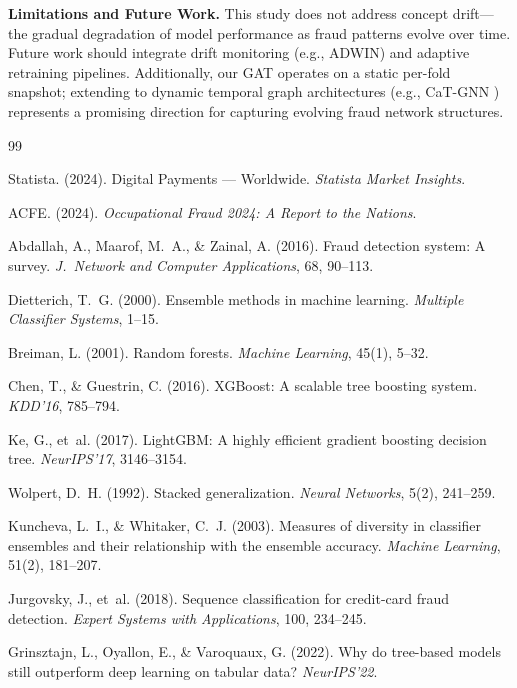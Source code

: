 \documentclass[10pt,a4paper,twocolumn]{article}
\begin{document}
\textbf{Limitations and Future Work.} This study does not address concept drift---the gradual degradation of model performance as fraud patterns evolve over time. Future work should integrate drift monitoring (e.g., ADWIN) and adaptive retraining pipelines. Additionally, our GAT operates on a static per-fold snapshot; extending to dynamic temporal graph architectures (e.g., CaT-GNN \cite{catgnn2024}) represents a promising direction for capturing evolving fraud network structures.

\balance

{\small
\begin{thebibliography}{99}

Statista. (2024). Digital Payments --- Worldwide. \textit{Statista Market Insights}.

ACFE. (2024). \textit{Occupational Fraud 2024: A Report to the Nations}.

Abdallah, A., Maarof, M.~A., \& Zainal, A. (2016). Fraud detection system: A survey. \textit{J.~Network and Computer Applications}, 68, 90--113.

Dietterich, T.~G. (2000). Ensemble methods in machine learning. \textit{Multiple Classifier Systems}, 1--15.

Breiman, L. (2001). Random forests. \textit{Machine Learning}, 45(1), 5--32.

Chen, T., \& Guestrin, C. (2016). XGBoost: A scalable tree boosting system. \textit{KDD'16}, 785--794.

Ke, G., et~al. (2017). LightGBM: A highly efficient gradient boosting decision tree. \textit{NeurIPS'17}, 3146--3154.

Wolpert, D.~H. (1992). Stacked generalization. \textit{Neural Networks}, 5(2), 241--259.

Kuncheva, L.~I., \& Whitaker, C.~J. (2003). Measures of diversity in classifier ensembles and their relationship with the ensemble accuracy. \textit{Machine Learning}, 51(2), 181--207.

Jurgovsky, J., et~al. (2018). Sequence classification for credit-card fraud detection. \textit{Expert Systems with Applications}, 100, 234--245.

Grinsztajn, L., Oyallon, E., \& Varoquaux, G. (2022). Why do tree-based models still outperform deep learning on tabular data? \textit{NeurIPS'22}.


\end{thebibliography}}
\end{document}
